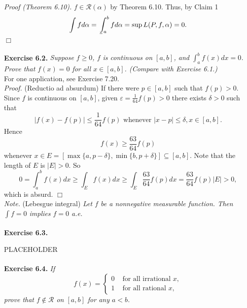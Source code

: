 \documentclass{article}
\def\lowint{\mkern3mu\underline{\vphantom{\intop}\mkern7mu}\mkern-10mu\int}
\begin{document}
\emph{Proof (Theorem 6.10).}
$f \in \mathscr{R}(\alpha)$ by Theorem 6.10.
Thus, by Claim 1
$$\int f d \alpha = \lowint_a^b f d\alpha = \sup L(P, f, \alpha) = 0.$$
$\Box$ \\\\






\textbf{Exercise 6.2.}
\emph{Suppose $f \geq 0$,
$f$ is continuous on $[a,b]$, and $\int_{a}^{b} f(x) dx = 0$.
Prove that $f(x) = 0$ for all $x \in [a,b]$.
(Compare with Exercise 6.1.)} \\

For one application, see Exercise 7.20. \\

\emph{Proof.}
(Reductio ad absurdum)
If there were $p \in [a,b]$ such that $f(p) > 0$.
Since $f$ is continuous on $[a,b]$, given $\varepsilon = \frac{1}{64}f(p) > 0$
there exists $\delta > 0$
such that
\[
  |f(x) - f(p)| \leq \frac{1}{64}f(p) \text{ whenever } |x-p| \leq \delta, x \in [a,b].
\]
Hence
\[
  f(x) \geq \frac{63}{64}f(p)
\]
whenever $x \in E = [\max\{a,p-\delta\}, \min\{b,p+\delta\}] \subseteq [a,b]$.
Note that the length of $E$ is $|E| > 0$.
So
\[
  0
  = \int_{a}^{b} f(x) dx
  \geq \int_{E} f(x) dx
  \geq \int_{E} \frac{63}{64}f(p) dx
  = \frac{63}{64}f(p)|E| > 0,
\]
which is absurd.
$\Box$ \\

\emph{Note.}
(Lebesgue integral)
\emph{Let $f$ be a nonnegative measurable function.
Then $\int f = 0$ implies $f = 0$ a.e.} \\\\






\textbf{Exercise 6.3.}

PLACEHOLDER \\\\






\textbf{Exercise 6.4.}
\emph{If
\begin{equation*}
  f(x) =
    \begin{cases}
      0 & \text{ for all irrational $x$}, \\
      1 & \text{ for all rational $x$},
    \end{cases}
\end{equation*}
prove that $f \not\in \mathscr{R}$ on $[a,b]$ for any $a < b$.} \\
\end{document}
